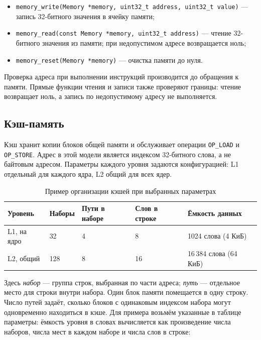 \documentclass[12pt,a4paper]{article}
\begin{document}
\begin{itemize}[leftmargin=1.5em]
    \item \texttt{memory\_write(Memory *memory, uint32\_t address, uint32\_t value)} --- запись 32-битного значения в ячейку памяти;
    \item \texttt{memory\_read(const Memory *memory, uint32\_t address)} --- чтение 32-битного значения из памяти; при недопустимом адресе возвращается ноль;
    \item \texttt{memory\_reset(Memory *memory)} --- очистка памяти до нуля.
\end{itemize}

Проверка адреса при выполнении инструкций производится до обращения к памяти. Прямые функции чтения и записи также проверяют границы: чтение возвращает ноль, а запись по недопустимому адресу не выполняется.

\subsection{Кэш-память}

Кэш хранит копии блоков общей памяти и обслуживает операции \texttt{OP\_LOAD} и \texttt{OP\_STORE}. Адрес в этой модели является индексом 32-битного слова, а не байтовым адресом. Параметры каждого уровня задаются конфигурацией: L1 отдельный для каждого ядра, L2 общий для всех ядер.

\begin{table}[H]
    \centering
    \caption{Пример организации кэшей при выбранных параметрах}
    \label{tab:cache-config}
    \begin{tabular}{|p{2.1cm}|p{2.1cm}|p{2.1cm}|p{2.5cm}|p{3.3cm}|}
        \hline
        \textbf{Уровень} & \textbf{Наборы} & \textbf{Пути в наборе} & \textbf{Слов в строке} & \textbf{Ёмкость данных} \\
        \hline
        L1, на ядро & 32 & 4 & 8 & 1024 слова (4 КиБ) \\
        \hline
        L2, общий & 128 & 8 & 16 & 16\,384 слова (64 КиБ) \\
        \hline
    \end{tabular}
\end{table}

Здесь \textit{набор} --- группа строк, выбранная по части адреса; \textit{путь} --- отдельное место для строки внутри набора. Один блок памяти помещается в одну строку. Число путей задаёт, сколько блоков с одинаковым индексом набора могут одновременно находиться в кэше. Для примера возьмём указанные в таблице параметры: ёмкость уровня в словах вычисляется как произведение числа наборов, числа мест в каждом наборе и числа слов в строке:
\end{document}
